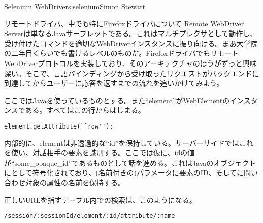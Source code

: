 \begin{aosachapter}{Selenium WebDriver}{s:selenium}{Simon Stewart}
\begin{aosasect1}{リモートドライバ、中でも特にFirefoxドライバについて}
Remote WebDriver Serverは単なるJavaサーブレットである。これはマルチプレクサとして動作し、受け付けたコマンドを適切なWebDriverインスタンスに振り向ける。まあ大学院の二年目くらいでも書けるレベルのものだ。FirefoxドライバでもリモートWebDriverプロトコルを実装しており、そのアーキテクチャのほうがずっと興味深い。そこで、言語バインディングから受け取ったリクエストがバックエンドに到達してからユーザーに応答を返すまでの流れを追いかけてみよう。


ここではJavaを使っているものとする。また``element''がWebElementのインスタンスである。すべてはこの行からはじまる。

\begin{verbatim}
element.getAttribute(``row'');
\end{verbatim}

\noindent 内部的に、elementは非透過的な``id''を保持している。サーバーサイドではこれを使い、対話相手の要素を識別する。ここでは仮に、idの値が``some\_opaque\_id''であるものとして話を進める。これはJavaのオブジェクトにとして符号化されており、(名前付きの)パラメータに要素のID、そしてに問い合わせ対象の属性の名前を保持する。

正しいURLを指すテーブル内での検索は、このようになる。

\begin{verbatim}
/session/:sessionId/element/:id/attribute/:name
\end{verbatim}


\end{aosasect1}
\end{aosachapter}
